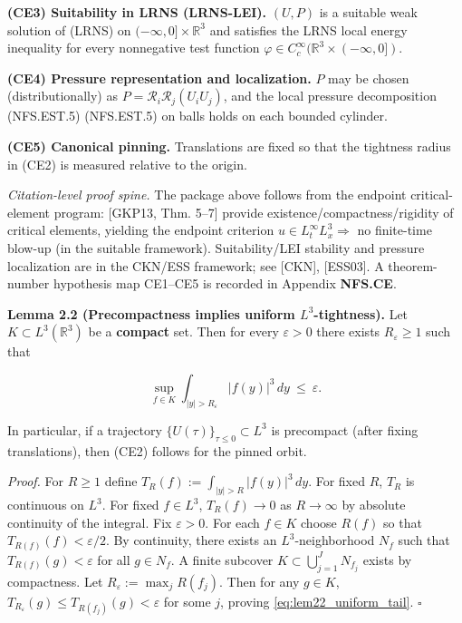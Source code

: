 \documentclass[
  11pt,
]{article}
\begin{document}
\textbf{(CE3) Suitability in LRNS (LRNS-LEI).} \((U,P)\) is a suitable weak solution of (LRNS) on \((-\infty,0]\times\mathbb R^3\) and satisfies the LRNS local energy inequality for every nonnegative test function \(\varphi\in C_c^\infty(\mathbb R^3\times(-\infty,0])\).

\textbf{(CE4) Pressure representation and localization.} \(P\) may be chosen (distributionally) as \(P=\mathcal R_i\mathcal R_j(U_iU_j)\), and the local pressure decomposition (NFS.EST.5) (NFS.EST.5) on balls holds on each bounded cylinder.

\textbf{(CE5) Canonical pinning.} Translations are fixed so that the tightness radius in (CE2) is measured relative to the origin.

\emph{Citation-level proof spine.} The package above follows from the endpoint critical-element program: {[}GKP13, Thm. 5--7{]} provide existence/compactness/rigidity of critical elements, yielding the endpoint criterion \(u\in L^\infty_tL^3_x\Rightarrow\) no finite-time blow-up (in the suitable framework). Suitability/LEI stability and pressure localization are in the CKN/ESS framework; see {[}CKN{]}, {[}ESS03{]}. A theorem-number hypothesis map CE1--CE5 is recorded in Appendix \textbf{NFS.CE}.

\textbf{Lemma 2.2 (Precompactness implies uniform \(L^3\)-tightness).} Let \(K\subset L^3(\mathbb R^3)\) be a \textbf{compact} set. Then for every \(\varepsilon>0\) there exists \(R_\varepsilon\ge 1\) such that

\begin{equation}
\sup_{f\in K}\int_{|y|>R_\varepsilon}|f(y)|^3\,dy\ \le\ \varepsilon.
\tag{2.2}\label{eq:lem22_uniform_tail}
\end{equation}

In particular, if a trajectory \(\{U(\tau)\}_{\tau\le 0}\subset L^3\) is precompact (after fixing translations), then (CE2) follows for the pinned orbit.

\emph{Proof.} For \(R\ge 1\) define \(T_R(f):=\int_{|y|>R}|f(y)|^3\,dy\). For fixed \(R\), \(T_R\) is continuous on \(L^3\). For fixed \(f\in L^3\), \(T_R(f)\to 0\) as \(R\to\infty\) by absolute continuity of the integral. Fix \(\varepsilon>0\). For each \(f\in K\) choose \(R(f)\) so that \(T_{R(f)}(f)<\varepsilon/2\). By continuity, there exists an \(L^3\)-neighborhood \(N_f\) such that \(T_{R(f)}(g)<\varepsilon\) for all \(g\in N_f\). A finite subcover \(K\subset\bigcup_{j=1}^J N_{f_j}\) exists by compactness. Let \(R_\varepsilon:=\max_j R(f_j)\). Then for any \(g\in K\), \(T_{R_\varepsilon}(g)\le T_{R(f_j)}(g)<\varepsilon\) for some \(j\), proving \eqref{eq:lem22_uniform_tail}. \(\square\)
\end{document}
